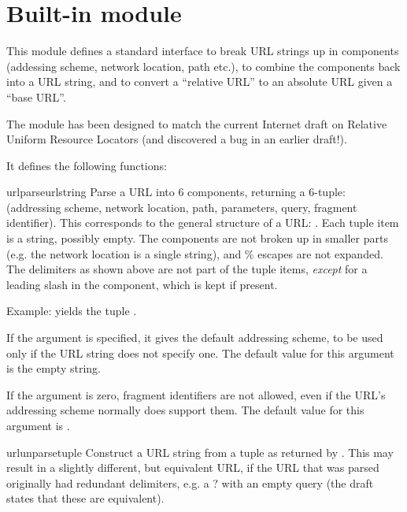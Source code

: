 \section{Built-in module }

This module defines a standard interface to break URL strings up in
components (addessing scheme, network location, path etc.), to combine
the components back into a URL string, and to convert a ``relative
URL'' to an absolute URL given a ``base URL''.

The module has been designed to match the current Internet draft on
Relative Uniform Resource Locators (and discovered a bug in an earlier
draft!).

It defines the following functions:

\begin{funcdesc}{urlparse}{urlstring}
Parse a URL into 6 components, returning a 6-tuple: (addressing
scheme, network location, path, parameters, query, fragment
identifier).  This corresponds to the general structure of a URL:
.
Each tuple item is a string, possibly empty.
The components are not broken up in smaller parts (e.g. the network
location is a single string), and \% escapes are not expanded.
The delimiters as shown above are not part of the tuple items, {\em
except} for a leading slash in the  component, which is
kept if present.

Example:
yields the tuple
.

If the  argument is specified, it gives the
default addressing scheme, to be used only if the URL string does not
specify one.  The default value for this argument is the empty string.

If the  argument is zero, fragment identifiers
are not allowed, even if the URL's addressing scheme normally does
support them.  The default value for this argument is .
\end{funcdesc}

\begin{funcdesc}{urlunparse}{tuple}
Construct a URL string from a tuple as returned by .
This may result in a slightly different, but equivalent URL, if the
URL that was parsed originally had redundant delimiters, e.g. a ? with
an empty query (the draft states that these are equivalent).
\end{funcdesc}

